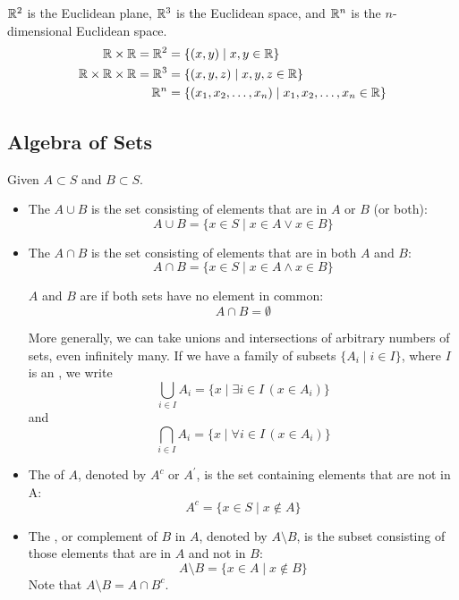 \begin{itemize}
\begin{example}
$\mathbb R^2$ is the Euclidean plane, $\mathbb R^3$ is the Euclidean space, and $\mathbb R^n$ is the $n$-dimensional Euclidean space.
\begin{align*}
\mathbb R \times \mathbb R = \mathbb R^2 &= \{(x,y) \mid x,y \in \mathbb R\} \\
\mathbb R \times \mathbb R \times \mathbb R = \mathbb R^3 &= \{(x,y,z) \mid x,y,z \in \mathbb R\} \\
\mathbb R^n &= \{(x_1,x_2,\dots,x_n) \mid x_1,x_2,\dots,x_n \in \mathbb R\}
\end{align*}
\end{example}
\end{itemize}

\subsection{Algebra of Sets}
Given $A \subset S$ and $B \subset S$.
\begin{itemize}
\item The  $A \cup B$ is the set consisting of elements that are in $A$ or $B$ (or both):
\[ A\cup B=\{x \in S \mid x\in A \lor x\in B\} \]

\item The  $A \cap B$ is the set consisting of elements that are in both $A$ and $B$:
\[ A\cap B=\{x \in S \mid x\in A \land x\in B\} \]

$A$ and $B$ are  if both sets have no element in common:
\[ A\cap B = \emptyset \]

More generally, we can take unions and intersections of arbitrary numbers of sets, even infinitely many. If we have a family of subsets $\{A_i \mid i \in I\}$, where $I$ is an , we write
\[ \bigcup_{i\in I} A_i = \{x \mid \exists i\in I\,(x\in A_i)\} \]
and
\[ \bigcap_{i\in I} A_i = \{x \mid \forall i\in I\,(x\in A_i)\} \] 

\item The  of $A$, denoted by $A^c$ or $A^\prime$, is the set containing elements that are not in A:
\[ A^c = \{x \in S \mid x \notin A\} \]

\item The , or complement of $B$ in $A$, denoted by $A\setminus B$, is the subset consisting of those elements that are in $A$ and not in $B$:
\[ A\setminus B = \{x \in A \mid x \notin B\} \]
Note that $A\setminus B = A \cap B^c$.
\end{itemize}

